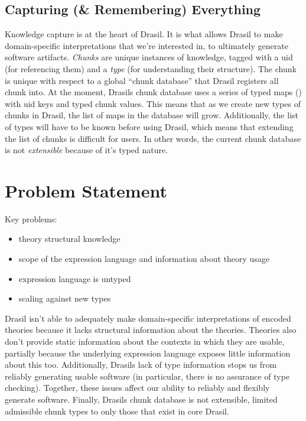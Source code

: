\subsection{Capturing (\& Remembering) Everything}

Knowledge capture is at the heart of Drasil. It is what allows Drasil to make
domain-specific interpretations that we're interested in, to ultimately generate
software artifacts. \textit{Chunks} are unique instances of knowledge, tagged
with a \acs{uid} (for referencing them) and a \textit{type} (for understanding
their structure). The chunk is unique with respect to a global ``chunk
database'' that Drasil registers all chunk into. At the moment, Drasils chunk
database uses a series of typed maps () with
\acs{uid} keys and typed chunk values. This means that as we create new types of
chunks in Drasil, the list of maps in the database will grow. Additionally, the
list of types will have to be known before using Drasil, which means that
extending the list of chunks is difficult for users. In other words, the current
chunk database is not \textit{extensible} because of it's typed nature.

\section{Problem Statement}
\label{sec:intro:problemStatement}

\begin{writingdirectives}
      \item Key problems:
      \begin{itemize}
            \item theory structural knowledge
            \item scope of the expression language and information about theory usage
            \item expression language is untyped
            \item scaling against new types
      \end{itemize}
\end{writingdirectives}

Drasil isn't able to adequately make domain-specific interpretations of encoded
theories because it lacks structural information about the theories. Theories
also don't provide static information about the contexts in which they are
usable, partially because the underlying expression language exposes little
information about this too. Additionally, Drasils lack of type information stops
us from reliably generating usable software (in particular, there is no
assurance of type checking). Together, these issues affect our ability to
reliably and flexibly generate software. Finally, Drasils chunk database is not
extensible, limited admissible chunk types to only those that exist in core
Drasil.

